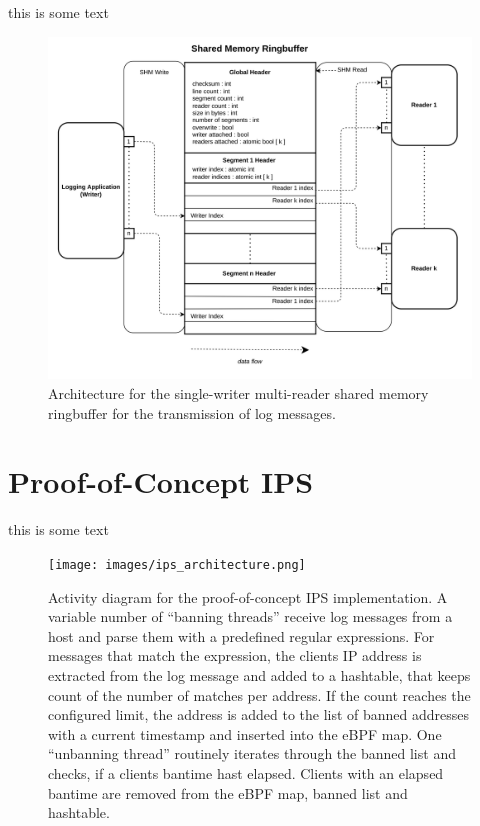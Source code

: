 \begin{algorithm}[h!]
    
    \label{alg:shm_seg_write}
    \caption[Shared Memory Ringbuffer: Segment Header Writer]{this is some text}
\end{algorithm}

\begin{figure}[p]
    \includegraphics[width=\textwidth]{images/shm_architecture.png}
    \caption[Shared Memory Architecture]{Architecture for the single-writer multi-reader shared memory ringbuffer for the transmission
    of log messages. }
\end{figure}

\section{Proof-of-Concept IPS}

\begin{algorithm}[h!]
    
    \label{alg:uring_getline}
    \caption[io\_uring Getline]{this is some text}
\end{algorithm}

\begin{figure}[p]
    \texttt{[image: images/ips\_architecture.png]}
    \caption[Simplefail2ban Architecture]{Activity diagram for the proof-of-concept IPS implementation. A variable number of ``banning threads'' receive log messages from a host and
    parse them with a predefined regular expressions. For messages that match the expression, the clients IP address is extracted from the log message and added to a hashtable, that keeps count of
    the number of matches per address. If the count reaches the configured limit, the address is added to the list of banned addresses with a current timestamp and inserted into the eBPF map. One ``unbanning
   thread'' routinely iterates through the banned list and checks, if a clients bantime hast elapsed. Clients with an elapsed bantime are removed from the eBPF map, banned list and hashtable.}
   \label{fig:meta_architecture}
\end{figure}

